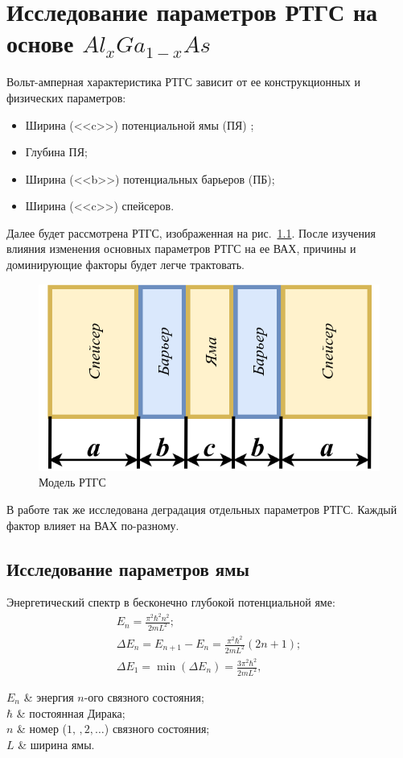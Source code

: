 \chapter{Исследование параметров РТГС на основе $Al_{x}Ga_{1-x}As$}
Вольт-амперная характеристика РТГС зависит от ее конструкционных и физических параметров:
\begin{itemize}
	\item Ширина (<<c>>) потенциальной ямы (ПЯ) ;
	\item Глубина ПЯ;
	\item Ширина (<<b>>) потенциальных барьеров (ПБ);
	\item Ширина (<<c>>) спейсеров.
\end{itemize}

Далее будет рассмотрена РТГС, изображенная на рис.~\ref{fig:RTD}. После изучения влияния изменения основных параметров РТГС на ее ВАХ, причины и доминирующие факторы будет легче трактовать.

\begin{figure}
	\centering
	\includegraphics[width=0.5\linewidth]{assets/RTD}
	\caption{Модель РТГС}
	\label{fig:RTD}
\end{figure} 

В работе \cite{Vetrova} так же исследована деградация отдельных параметров РТГС. Каждый фактор влияет на ВАХ по-разному.

\section{Исследование параметров ямы}
Энергетический спектр в бесконечно глубокой потенциальной яме:
\begin{gather}
	\label{eq:En}
	E_{n} = \frac{\pi^{2}\hbar^{2}n^{2}}{2mL^{2}};\\
	\Delta E_{n} = E_{n+1} - E_{n} = \frac{\pi^{2}\hbar^{2}}{2mL^{2}}(2n + 1);\\
	\label{eq:dEn1}
	\Delta E_{1} = \min(\Delta E_{n}) = \frac{3\pi^{2}\hbar^{2}}{2mL^{2}},
\end{gather}
\begin{conditions}
	$E_{n}$ & энергия $n$-ого связного состояния;\\
	$\hbar$ & постоянная Дирака;\\
	$n$ & номер ($1,\,,2,\dots$) связного состояния;\\
	$L$ & ширина ямы.
\end{conditions}

